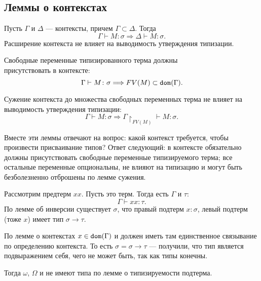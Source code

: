 \documentclass[11pt,a4paper]{article}
\begin{document}
\subsection{Леммы о контекстах}
\begin{lm}[,,разбавления'']
    Пусть $ \Gamma $ и $ \Delta $ --- контексты, причем $ \Gamma \subset  \Delta $. Тогда 
	\[
	\Gamma \vdash M \colon \sigma  \Longrightarrow \Delta \vdash M\colon \sigma 
	.\] 
	Расширение контекста не влияет на выводимость утверждения типизации.
\end{lm}
\begin{lm}
	Свободные переменные типизированного терма должны \\ присутствовать в контексте:
    \[
		\Gamma \vdash M \colon \sigma  \Longrightarrow FV(M) \subset \operatorname{\mathtt{dom}}( \Gamma )
	.\]
\end{lm}
\begin{lm}[сужения]
    Сужение контекста до множества свободных переменных терма не влияет на выводимость утверждения типизации:
	\[
		\Gamma \vdash M \colon \sigma \Longrightarrow \Gamma \!\!\upharpoonright _{FV(M)} \vdash M \colon \sigma 
	.\] 
\end{lm}
Вместе эти леммы отвечают на вопрос: какой контекст требуется, чтобы произвести присваивание типов? Ответ следующий: в контексте обязательно должны присутствовать свободные переменные типизируемого терма; все остальные переменные опциональны, не влияют на типизацию и могут быть безболезненно отброшены по лемме сужения.

Рассмотрим предтерм $ x x$. Пусть это терм.
Тогда есть  $ \Gamma $ и $\tau $:
\[
\Gamma \vdash x x \colon \tau 
.\] 
По лемме об инверсии существует $ \sigma $, что правый подтерм $ x\colon \sigma$, левый подтерм (тоже $ x$) имеет тип  $ \sigma  \to  \tau $.

По лемме о контекстах $ x \in \operatorname{\mathtt{dom}}(\Gamma)$ и должен иметь там единственное связывание по определению контекста. То есть $ \sigma = \sigma  \to  \tau $ --- получили, что тип является подвыражением себя, чего не может быть, так как типы конечны.

Тогда $ \omega $,  $ \Omega $ и \Y не имеют типа по лемме о типизируемости подтерма.
\end{document}
